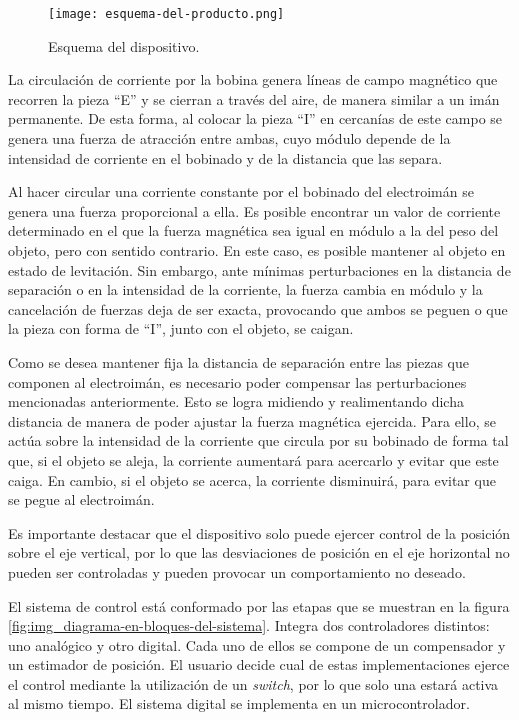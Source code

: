 \begin{figure}[H]
	\centering
	\texttt{[image: esquema-del-producto.png]}
	\caption{Esquema del dispositivo.}
	\label{fig:img_Esquema-del-producto}
\end{figure}

La circulación de corriente por la bobina genera líneas de campo magnético que recorren la pieza “E” y se cierran a través del aire, de manera similar a un imán permanente. De esta forma, al colocar la pieza “I” en cercanías de este campo se genera una fuerza de atracción entre ambas, cuyo módulo depende de la intensidad de corriente en el bobinado y de la distancia que las separa.

Al hacer circular una corriente constante por el bobinado del electroimán se genera una fuerza proporcional a ella. Es posible encontrar un valor de corriente determinado en el que la fuerza magnética sea igual en módulo a la del peso del objeto, pero con sentido contrario. En este caso, es posible mantener al objeto en estado de levitación. Sin embargo, ante mínimas perturbaciones en la distancia de separación o en la intensidad de la corriente,  la fuerza cambia en módulo y la cancelación de fuerzas deja de ser exacta, provocando que ambos se peguen o que la pieza con forma de “I”, junto con el objeto, se caigan. 

Como se desea mantener fija la distancia de separación entre las piezas que componen al electroimán, es necesario poder compensar las perturbaciones mencionadas anteriormente.   Esto se logra midiendo y realimentando dicha distancia de manera de poder ajustar la fuerza magnética ejercida. Para ello, se actúa sobre la intensidad de la corriente que circula por su bobinado de forma tal que, si el objeto se aleja, la corriente aumentará para acercarlo y evitar que este caiga. En cambio, si el objeto se acerca, la corriente disminuirá, para evitar que se pegue al electroimán. 

Es importante destacar que el dispositivo solo puede ejercer control de la posición sobre el eje vertical, por lo que las desviaciones de posición en el eje horizontal no pueden ser controladas y pueden provocar un comportamiento no deseado.

El sistema de control está conformado por las etapas que se muestran en la figura \ref{fig:img_diagrama-en-bloques-del-sistema}. Integra dos controladores distintos: uno analógico y otro digital. Cada uno de ellos se compone de un compensador y un estimador de posición. El usuario decide cual de estas implementaciones ejerce el control mediante la utilización de un \textsl{switch}, por lo que solo una estará activa al mismo tiempo. El sistema digital se implementa en un microcontrolador.

